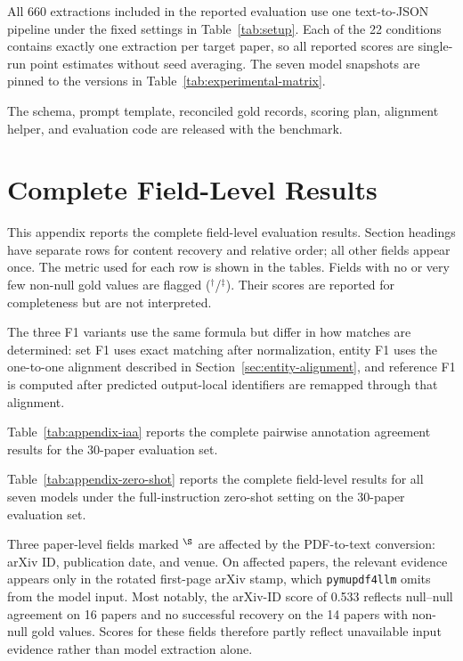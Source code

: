 All 660 extractions included in the reported evaluation use one text-to-JSON
pipeline under the fixed settings in Table~\ref{tab:setup}. Each of the 22
conditions contains exactly one extraction per target paper, so all reported
scores are single-run point estimates without seed averaging. The seven model
snapshots are pinned to the versions in
Table~\ref{tab:experimental-matrix}.



The schema, prompt template, reconciled gold records, scoring plan, alignment
helper, and evaluation code are released with the benchmark.


\section{Complete Field-Level Results}
\label{app:complete-results}

This appendix reports the complete field-level evaluation results. Section
headings have separate rows for content recovery and relative order; all other
fields appear once. The metric used for each row is shown in the tables.
Fields with no or very few non-null gold values are flagged
($^{\dagger}$/$^{\ddagger}$). Their scores are reported for completeness but
are not interpreted.

The three F1 variants use the same formula but differ in how matches are
determined: set F1 uses exact matching after normalization, entity F1 uses the
one-to-one alignment described in Section~\ref{sec:entity-alignment}, and
reference F1 is computed after predicted output-local identifiers are remapped
through that alignment.

Table~\ref{tab:appendix-iaa} reports the complete pairwise annotation agreement
results for the 30-paper evaluation set.



Table~\ref{tab:appendix-zero-shot} reports the complete field-level results for
all seven models under the full-instruction zero-shot setting on the 30-paper
evaluation set.

Three paper-level fields marked $^{\S}$ are affected by the PDF-to-text
conversion: arXiv ID, publication date, and venue. On affected papers, the
relevant evidence appears only in the rotated first-page arXiv stamp, which
\texttt{pymupdf4llm} omits from the model input. Most notably, the arXiv-ID
score of 0.533 reflects null--null agreement on 16 papers and no successful
recovery on the 14 papers with non-null gold values. Scores for these fields
therefore partly reflect unavailable input evidence rather than model
extraction alone.


